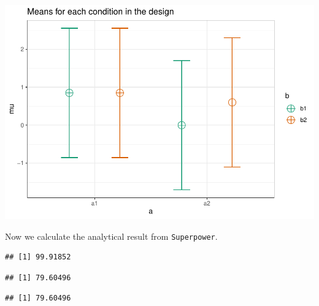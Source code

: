 \documentclass[]{book}
\newenvironment{Shaded}{\begin{snugshade}}{\end{snugshade}}
\newcommand{\KeywordTok}[1]{\textcolor[rgb]{0.13,0.29,0.53}{\textbf{#1}}}
\newcommand{\NormalTok}[1]{#1}
\newcommand{\OperatorTok}[1]{\textcolor[rgb]{0.81,0.36,0.00}{\textbf{#1}}}
\newcommand{\StringTok}[1]{\textcolor[rgb]{0.31,0.60,0.02}{#1}}
\begin{document}
\includegraphics{SuperpowerValidation_files/figure-latex/aberson_5.3-1.pdf}

Now we calculate the analytical result from \texttt{Superpower}.

\begin{Shaded}
\end{Shaded}

\begin{verbatim}
## [1] 99.91852
\end{verbatim}

\begin{Shaded}
\end{Shaded}

\begin{verbatim}
## [1] 79.60496
\end{verbatim}

\begin{Shaded}
\end{Shaded}

\begin{verbatim}
## [1] 79.60496
\end{verbatim}
\end{document}
